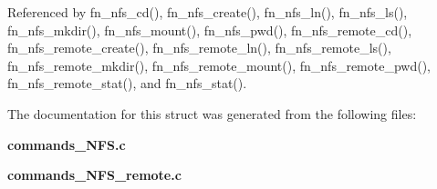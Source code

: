 Referenced by fn\_\-nfs\_\-cd(), fn\_\-nfs\_\-create(), fn\_\-nfs\_\-ln(), fn\_\-nfs\_\-ls(), fn\_\-nfs\_\-mkdir(), fn\_\-nfs\_\-mount(), fn\_\-nfs\_\-pwd(), fn\_\-nfs\_\-remote\_\-cd(), fn\_\-nfs\_\-remote\_\-create(), fn\_\-nfs\_\-remote\_\-ln(), fn\_\-nfs\_\-remote\_\-ls(), fn\_\-nfs\_\-remote\_\-mkdir(), fn\_\-nfs\_\-remote\_\-mount(), fn\_\-nfs\_\-remote\_\-pwd(), fn\_\-nfs\_\-remote\_\-stat(), and fn\_\-nfs\_\-stat().

The documentation for this struct was generated from the following files:\begin{CompactItemize}
\item 
{\bf commands\_\-NFS.c}\item 
{\bf commands\_\-NFS\_\-remote.c}\end{CompactItemize}
